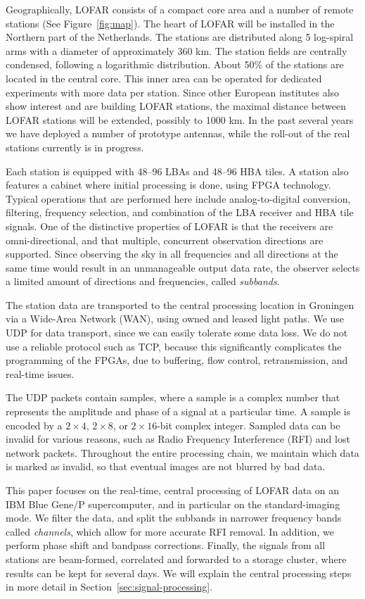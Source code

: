 \documentclass{sig-alternate}
\begin{document}
Geographically, LOFAR consists of a compact core area and a number of
remote stations (See Figure~\ref{fig:map}).  The heart of LOFAR will
be installed in the Northern part of the Netherlands.  The stations
are distributed along 5 log-spiral arms with a diameter of
approximately 360 km. The station fields are centrally condensed,
following a logarithmic distribution.  About 50\% of the stations are
located in the central core. This inner area can be operated for
dedicated experiments with more data per station.  Since other
European institutes also show interest and are building LOFAR
stations, the maximal distance between LOFAR stations will be
extended, possibly to 1000 km.  In the past several years we have
deployed a number of prototype antennas, while the roll-out of the
real stations currently is in progress.

Each station is equipped with 48--96 LBAs and 48--96 HBA tiles. 
A station also features a cabinet where initial processing is done, using
FPGA technology.
Typical operations that are performed here include analog-to-digital
conversion, filtering, frequency selection, and combination of the LBA
receiver and HBA tile signals.
One of the distinctive properties of LOFAR is that the receivers are
omni-directional, and that multiple, concurrent observation directions are
supported.
Since observing the sky in all frequencies and all directions at the same time
would result in an unmanageable output data rate, the observer selects a
limited amount of directions and frequencies, called \emph{subbands}.

The station data are transported to the central processing location in
Groningen via a Wide-Area Network (WAN), using owned and leased light paths.
We use UDP for data transport, since we can easily tolerate some data loss.
We do not use a reliable protocol such as TCP, because this significantly
complicates the programming of the FPGAs, due to buffering, flow control,
retransmission, and real-time issues.

The UDP packets contain samples, where a sample is a complex number
that represents the amplitude and phase of a signal at a particular
time.  A sample is encoded by a $2\times4$, $2\times8$, or $2\times16$-bit
complex integer. Sampled data can be invalid for various reasons, such as
Radio Frequency Interference (RFI) and lost network packets.
Throughout the entire processing chain, we maintain which
data is marked as invalid, so that eventual images are not blurred by
bad data.  

This paper focuses on the real-time, central processing of LOFAR data on
an IBM Blue Gene/P supercomputer, and in particular on the standard-imaging
mode.
We filter the data, and split the subbands in narrower frequency bands called
\emph{channels}, which allow for more accurate RFI removal.
In addition, we perform phase shift and bandpass corrections.
Finally, the signals from all stations are beam-formed,
correlated and forwarded to a storage cluster, where results can be
kept for several days.  We will explain the central processing steps
in more detail in Section~\ref{sec:signal-processing}.
\end{document}
